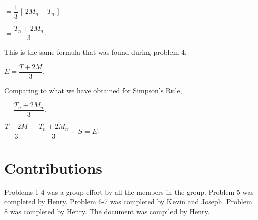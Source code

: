 \documentclass[letterpaper,12pt]{article}
\theoremstyle{definition}
\begin{document}
\vskip 16pt

$=\dfrac{1}{3}\, [\, 2M_n+T_n\, ]$

\vskip 16pt

$=\dfrac{T_n+2M_n}{3}$.

\vspace{1cm}

This is the same formula that was found during problem 4,

\vspace{0.5cm}

\begin{center}
 \hspace{-7mm}$E=\dfrac{T+2M}{3}$.
\end{center}

\vspace{0.5cm}

Comparing to what we have obtained for Simpson's Rule,

\vspace{0.5cm}

\begin{center}
 $=\dfrac{T_n+2M_n}{3}$.
\end{center}

\vskip 16pt

\begin{center}
 \hspace{-18mm}$\dfrac{T+2M}{3}$ = $\dfrac{T_n+2M_n}{3}$
 \vskip 16pt
 \hspace{-26mm}$\therefore\ \ S=E$.
\end{center}

\pagebreak

\section*{Contributions}

\vspace{1cm}

\begin{large}

Problems 1-4 was a group effort by all the members in the group. Problem 5 was completed by Henry. Problem 6-7 was completed by Kevin and Joseph. Problem 8 was completed by Henry. The document was compiled by Henry.

\end{large}
\end{document}
